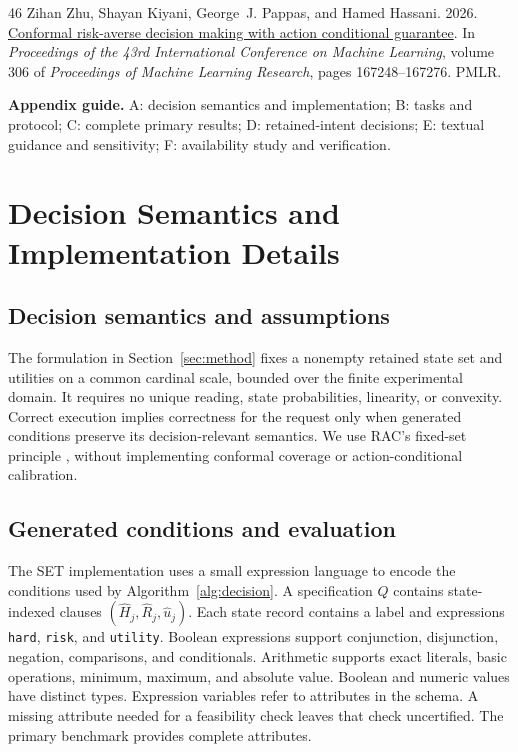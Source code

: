 \documentclass[11pt]{article}
\renewcommand{\dbltopfraction}{0.85}
\begin{document}
\begin{thebibliography}{46}
Zihan Zhu, Shayan Kiyani, George~J. Pappas, and Hamed Hassani. 2026.
\newblock \href {https://proceedings.mlr.press/v306/zhu26z.html} {Conformal risk-averse decision making with action conditional guarantee}.
\newblock In \emph{Proceedings of the 43rd International Conference on Machine Learning}, volume 306 of \emph{Proceedings of Machine Learning Research}, pages 167248--167276. PMLR.

\end{thebibliography}

\clearpage
\appendix
\setcounter{dbltopnumber}{2}
\renewcommand{\dbltopfraction}{0.7}
\makeatletter
\setlength{\@dblfptop}{0pt}
\setlength{\@dblfpsep}{18pt}
\setlength{\@dblfpbot}{0pt plus 1fil}
\makeatother
\noindent\textbf{Appendix guide.} A: decision semantics and implementation; B: tasks and protocol;
C: complete primary results; D: retained-intent decisions;
E: textual guidance and sensitivity; F: availability study and verification.
\section{Decision Semantics and Implementation Details}
\label{app:proofs}
\subsection{Decision semantics and assumptions}
The formulation in Section~\ref{sec:method} fixes a nonempty retained state set and utilities on a common cardinal scale, bounded over the finite experimental domain. It requires no unique reading, state probabilities, linearity, or convexity. Correct execution implies correctness for the request only when generated conditions preserve its decision-relevant semantics. We use RAC's fixed-set principle \citep{rac}, without implementing conformal coverage or action-conditional calibration.

\label{app:ambiguity}

\subsection{Generated conditions and evaluation}
\label{app:interface}
The SET implementation uses a small expression language to encode the conditions used by Algorithm~\ref{alg:decision}. A specification $Q$ contains state-indexed clauses $(\widehat H_j,\widehat R_j,\widehat u_j)$. Each state record contains a label and expressions \texttt{hard}, \texttt{risk}, and \texttt{utility}. Boolean expressions support conjunction, disjunction, negation, comparisons, and conditionals. Arithmetic supports exact literals, basic operations, minimum, maximum, and absolute value. Boolean and numeric values have distinct types. Expression variables refer to attributes in the schema. A missing attribute needed for a feasibility check leaves that check uncertified. The primary benchmark provides complete attributes.
\end{document}

